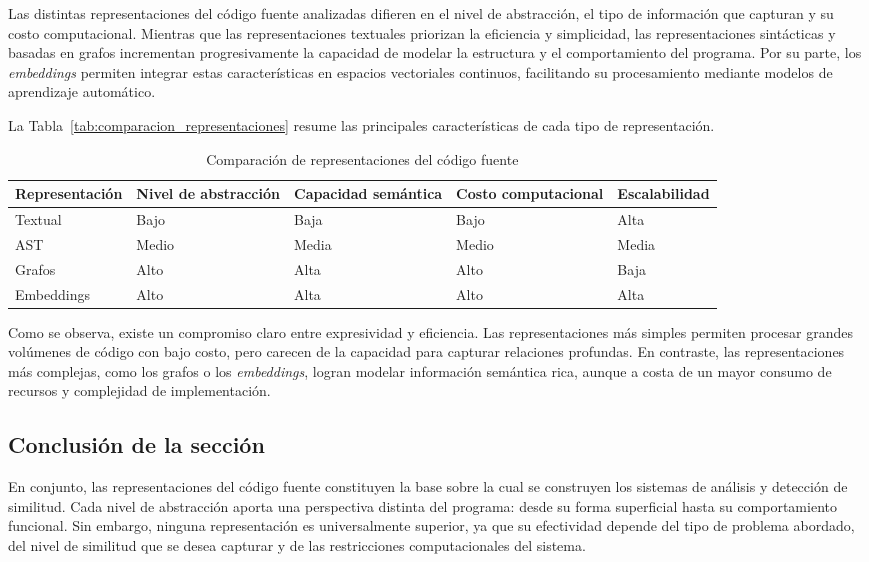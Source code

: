 Las distintas representaciones del código fuente analizadas difieren en el nivel de abstracción, el tipo de información que capturan y su costo computacional. Mientras que las representaciones textuales priorizan la eficiencia y simplicidad, las representaciones sintácticas y basadas en grafos incrementan progresivamente la capacidad de modelar la estructura y el comportamiento del programa. Por su parte, los \textit{embeddings} permiten integrar estas características en espacios vectoriales continuos, facilitando su procesamiento mediante modelos de aprendizaje automático.

La Tabla~\ref{tab:comparacion_representaciones} resume las principales características de cada tipo de representación.

\begin{table}[htbp]
\centering
\begin{tabularx}{\textwidth}{lXXXX}
\hline
\textbf{Representación} & \textbf{Nivel de abstracción} & \textbf{Capacidad semántica} & \textbf{Costo computacional} & \textbf{Escalabilidad} \\
\hline
Textual & Bajo & Baja & Bajo & Alta \\
AST & Medio & Media & Medio & Media \\
Grafos & Alto & Alta & Alto & Baja \\
Embeddings & Alto & Alta & Alto & Alta \\
\hline
\end{tabularx}
\caption{Comparación de representaciones del código fuente}
\end{table}

Como se observa, existe un compromiso claro entre expresividad y eficiencia. Las representaciones más simples permiten procesar grandes volúmenes de código con bajo costo, pero carecen de la capacidad para capturar relaciones profundas. En contraste, las representaciones más complejas, como los grafos o los \textit{embeddings}, logran modelar información semántica rica, aunque a costa de un mayor consumo de recursos y complejidad de implementación.

\subsection*{Conclusión de la sección}

En conjunto, las representaciones del código fuente constituyen la base sobre la cual se construyen los sistemas de análisis y detección de similitud. Cada nivel de abstracción aporta una perspectiva distinta del programa: desde su forma superficial hasta su comportamiento funcional. Sin embargo, ninguna representación es universalmente superior, ya que su efectividad depende del tipo de problema abordado, del nivel de similitud que se desea capturar y de las restricciones computacionales del sistema.

